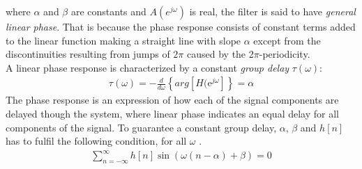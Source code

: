 where $\alpha$ and $\beta$ are constants and $A(e^{j\omega})$ is real, the filter is said to have \textit{general linear phase}. That is because the phase response consists of constant terms added to the linear function making a straight line with slope $\alpha$ except from the discontinuities resulting from jumps of $2\pi$ caused by the 2$\pi$-periodicity. \\
A linear phase response is characterized by a constant \textit{group delay} $\tau(\omega)$:
\begin{align}
\tau(\omega)=-\frac{d}{d\omega}\left\{ arg \left[ H(\text{e}^{j\omega}\right] \right\} = \alpha
\end{align}
The phase response is an expression of how each of the signal components are delayed though the system, where linear phase indicates an equal delay for all components of the signal. To guarantee a constant group delay, $\alpha$, $\beta$ and $h[n]$ has to fulfil the following condition, for all $\omega$ \cite{DTSP, p. 341}.
\begin{align}\label{eq:cons_gro}
\sum_{n=-\infty}^{\infty}h[n]\sin\left(\omega \left(n-\alpha \right) + \beta \right) = 0
\end{align}


